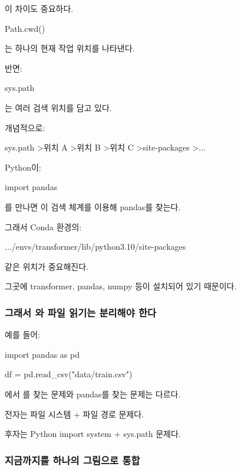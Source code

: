 이 차이도 중요하다.

\begin{dhkcode}
Path.cwd()
\end{dhkcode}

는 하나의 현재 작업 위치를 나타낸다.

반면:

\begin{dhkcode}
sys.path
\end{dhkcode}

는 여러 검색 위치를 담고 있다.

개념적으로:

\begin{dhkdir}
sys.path
>위치 A
>위치 B
>위치 C
>site-packages
>...
\end{dhkdir}

Python이:

\begin{dhkcode}
import pandas
\end{dhkcode}

를 만나면 이 검색 체계를 이용해 pandas를 찾는다.

그래서 Conda 환경의:

\begin{dhkzsh}
.../envs/transformer/lib/python3.10/site-packages
\end{dhkzsh}

같은 위치가 중요해진다.

그곳에 transformer, pandas, numpy 등이 설치되어 있기 때문이다.

\subsubsection{그래서 와 파일 읽기는 분리해야 한다}

예를 들어:

\begin{dhkcode}
import pandas as pd

df = pd.read_csv("data/train.csv")
\end{dhkcode}

에서 를 찾는 문제와 pandas를 찾는 문제는 다르다.

전자는 파일 시스템 + 파일 경로 문제다.

후자는 Python import system + sys.path 문제다.

\subsubsection{지금까지를 하나의 그림으로 통합}

